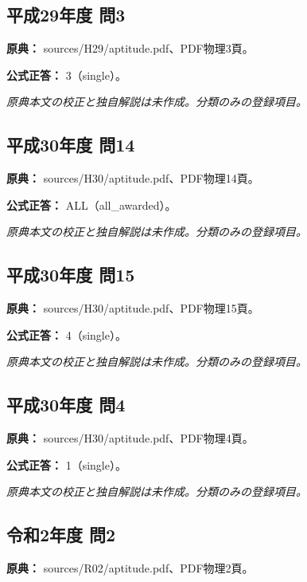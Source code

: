 \subsection{平成29年度 問3}
\label{q:h29-reg-apt-03}

\noindent\textbf{原典：} sources/H29/aptitude.pdf、PDF物理3頁。

\textbf{公式正答：} 3（single）。

\par\textit{原典本文の校正と独自解説は未作成。分類のみの登録項目。}

\subsection{平成30年度 問14}
\label{q:h30-reg-apt-14}

\noindent\textbf{原典：} sources/H30/aptitude.pdf、PDF物理14頁。

\textbf{公式正答：} ALL（all\_awarded）。

\par\textit{原典本文の校正と独自解説は未作成。分類のみの登録項目。}

\subsection{平成30年度 問15}
\label{q:h30-reg-apt-15}

\noindent\textbf{原典：} sources/H30/aptitude.pdf、PDF物理15頁。

\textbf{公式正答：} 4（single）。

\par\textit{原典本文の校正と独自解説は未作成。分類のみの登録項目。}

\subsection{平成30年度 問4}
\label{q:h30-reg-apt-04}

\noindent\textbf{原典：} sources/H30/aptitude.pdf、PDF物理4頁。

\textbf{公式正答：} 1（single）。

\par\textit{原典本文の校正と独自解説は未作成。分類のみの登録項目。}

\subsection{令和2年度 問2}
\label{q:r02-reg-apt-02}

\noindent\textbf{原典：} sources/R02/aptitude.pdf、PDF物理2頁。

